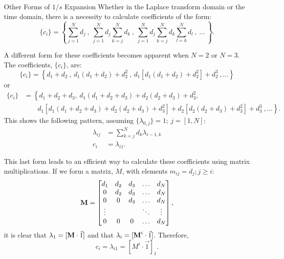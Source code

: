 \begin{chapter}{Other Forms  of $1/s$ Expansion\label{app:math.1_s}}
  Whether in the Laplace transform domain or the time domain, there is
  a necessity to calculate coefficients of the form:
  \begin{equation}
    \{c_i\} = \left \{\sum_{j=1}^N d_j \ ,\ \sum_{j=1}^N d_j \sum_{k=j}^N
              d_k\ ,\ \sum_{j=1}^N d_j \sum_{k=j}^N d_k \sum_{l=k}^N d_l\ ,\ \ldots\
              \right \}.
  \end{equation}
  
  A different form for these coefficients becomes apparent when $N=2$
  or $N=3$.  The coefficients, $\{c_i\}$, are:
  \begin{equation}
    \{c_i\} = \left \{ d_1 + d_2\ ,\ d_1(d_1+d_2)+d_2^2\ ,
              \ d_1\left[d_1(d_1+d_2)+d_2^2\right] + d_2^3\ , \ldots \right\}
  \end{equation}
  or
  \begin{equation}
    \begin{split}
      \{c_i\} &= \left \{ d_1+d_2+d_3,\ d_1(d_1+d_2+d_3)+d_2(d_2+d_3)+d_3^2,\ \right. \\
              &\quad\quad \left. d_1\left[d_1(d_1+d_2+d_3)+d_2(d_2+d_3)+d_3^2 \right] 
               + d_2\left[d_2(d_2+d_3)+d_3^2\right] +d_3^3\ , \ldots \right \}.
    \end{split}
  \end{equation}
  This shows the following pattern, assuming $\{\lambda_{0,j}\} = 1;\ j=[1,N]$:
  \begin{align}
    \lambda_{ij} &= \sum_{k=j}^N d_k \lambda_{i-1,k}\\
    c_i &= \lambda_{i1}.
  \end{align}
  
  This last form leads to an efficient way to calculate these
  coefficients using matrix multiplications.  If we form a matrix,
  $M$, with elements $m_{ij} = d_j; j \geq i$:
  \begin{equation}
    \mbox{$\mathbf{M}$} = \begin{bmatrix}
      d_1 & d_2 & d_3 & \ldots & d_N\\
      0 & d_2 & d_3 & \ldots & d_N\\
      0 & 0 & d_3 & \ldots & d_N\\
      \vdots & & & \ddots & \vdots\\
      0 & 0 & 0 & \ldots & d_N\\
    \end{bmatrix},
  \end{equation}
  it is clear that $\lambda_1 = [\mbox{$\mathbf{M}$}\cdot\vec{1}]$ and that
  $\lambda_i = [\mbox{$\mathbf{M}$}^i\cdot\vec{1}]$.  Therefore,
  \begin{equation}
    c_i = \lambda_{i1} = \left [M^i\cdot \vec{1}\right]_1.
  \end{equation}


\end{chapter}

